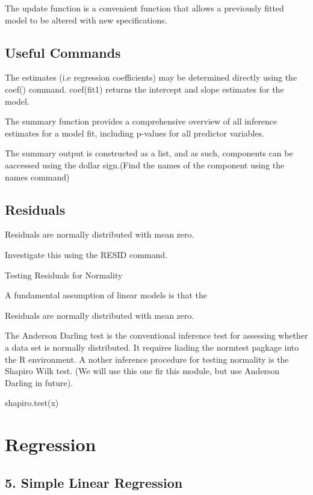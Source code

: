 The update function is a convenient function that allows a previously fitted model to be altered with new specifications.


\subsection{Useful Commands}

The estimates (i.e regression coefficients) may be determined directly using the coef() command. coef(fit1) returns the intercept and slope estimates for the model.


The summary function provides a comprehensive overview of all inference estimates for a model fit, including p-values for all predictor variables.


The summary output is constructed as a list, and as such, components can be aaccessed using the dollar sign.(Find the names of the component using the names command)

\subsection{Residuals}

Residuals are normally distributed with mean zero. 

Investigate this using the RESID command.

Testing Residuals for Normality


A fundamental assumption of linear models is that the

Residuals are normally distributed with mean zero.


The Anderson Darling test is the conventional inference test for assessing whether a data set is normally distributed. It requires liading the normtest pagkage into the R environment. A nother inference procedure for testing normality is the Shapiro Wilk test. (We will use this one fir this module, but use Anderson Darling in future).


shapiro.test(x)


\section{Regression}
\subsection{5. Simple Linear Regression}


